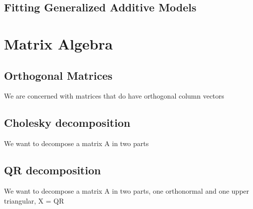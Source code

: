 \documentclass{article}
\begin{document}
    \subsection{Fitting Generalized Additive Models}

    \section{Matrix Algebra}
    \subsection{Orthogonal Matrices}
    We are concerned with matrices that do have orthogonal column vectors
    \subsection{Cholesky decomposition}
    We want to decompose a matrix A in two parts
    \subsection{QR decomposition}
    We want to decompose a matrix A in two parts, one orthonormal and one upper triangular, X = QR


    \newpage


    \newpage
\end{document}
